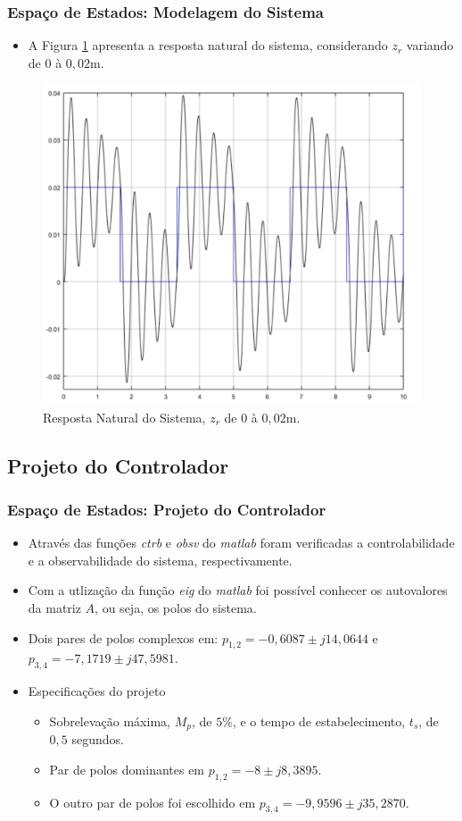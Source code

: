 \documentclass{beamer}
\begin{document}
\begin{frame}
\frametitle{Espaço de Estados: Modelagem do Sistema}
\begin{itemize}
\item A Figura \ref{malhaabertaEE2} apresenta a resposta natural do sistema, considerando $z_r$ variando de $0$ à $0,02$m.
\end{itemize}
\begin{figure}[H]
	\centering
\includegraphics[width=.55\columnwidth]{./imagens/resposta_natural_sistema2.pdf}
    \renewcommand{\figurename}{Fig. 6}
    \caption{Resposta Natural do Sistema, $z_r$ de $0$ à $0,02$m.}
	\label{malhaabertaEE2}
\end{figure}
\end{frame}

\subsection{Projeto do Controlador}
\begin{frame}
\frametitle{Espaço de Estados: Projeto do Controlador}
\begin{itemize}
\item Através das funções \textit{ctrb} e \textit{obsv} do \textit{matlab} foram verificadas a controlabilidade e a observabilidade do sistema, respectivamente.
\item Com a utlização da função \textit{eig} do \textit{matlab} foi possível conhecer os autovalores da matriz $A$, ou seja, os polos do sistema.
\item Dois pares de polos complexos em: $p_{1,2}= -0,6087 \pm j14,0644$ e $p_{3,4}=-7,1719 \pm j47,5981$.

\item Especificações do projeto
\begin{itemize}
\item Sobrelevação máxima, $M_p$, de $5\%$, e o tempo de estabelecimento, $t_s$, de $0,5$ segundos.
\item Par de polos dominantes em $p_{1,2} = -8 \pm j8,3895$.
\item O outro par de polos foi escolhido em $p_{3,4} = -9,9596 \pm j35,2870$.
\end{itemize}
\end{itemize}
\end{frame}
\end{document}
